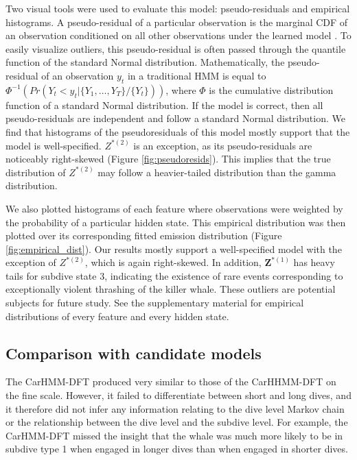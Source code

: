 Two visual tools were used to evaluate this model: pseudo-residuals and empirical histograms. A pseudo-residual of a particular observation is the marginal CDF of an observation conditioned on all other observations under the learned model \citep{Zucchini:2016}. To easily visualize outliers, this pseudo-residual is often passed through the quantile function of the standard Normal distribution. Mathematically, the pseudo-residual of an observation $y_t$ in a traditional HMM is equal to $\Phi^{-1} \left(Pr(Y_t < y_t|\{Y_1,\ldots,Y_T\}/\{Y_t\}) \right)$, where $\Phi$ is the cumulative distribution function of a standard Normal distribution. If the model is correct, then all pseudo-residuals are independent and follow a standard Normal distribution. We find that histograms of the pseudoresiduals of this model mostly support that the model is well-specified. $Z^{*(2)}$ is an exception, as its pseudo-residuals are noticeably right-skewed (Figure \ref{fig:pseudoresids}). This implies that the true distribution of $Z^{*(2)}$ may follow a heavier-tailed distribution than the gamma distribution. 

We also plotted histograms of each feature where observations were weighted by the probability of a particular hidden state. This empirical distribution was then plotted over its corresponding fitted emission distribution (Figure \ref{fig:empirical_dist}). Our results mostly support a well-specified model with the exception of $Z^{*(2)}$, which is again right-skewed. In addition, $\mathbf{Z}^{*(1)}$ has heavy tails for subdive state 3, indicating the existence of rare events corresponding to exceptionally violent thrashing of the killer whale. These outliers are potential subjects for future study. See the supplementary material for empirical distributions of every feature and every hidden state. 

\subsection{Comparison with candidate models}

The CarHMM-DFT produced very similar to those of the CarHHMM-DFT on the fine scale. However, it failed to differentiate between short and long dives, and it therefore did not infer any information relating to the dive level Markov chain or the relationship between the dive level and the subdive level. For example, the CarHMM-DFT missed the insight that the whale was much more likely to be in subdive type 1 when engaged in longer dives than when engaged in shorter dives.

